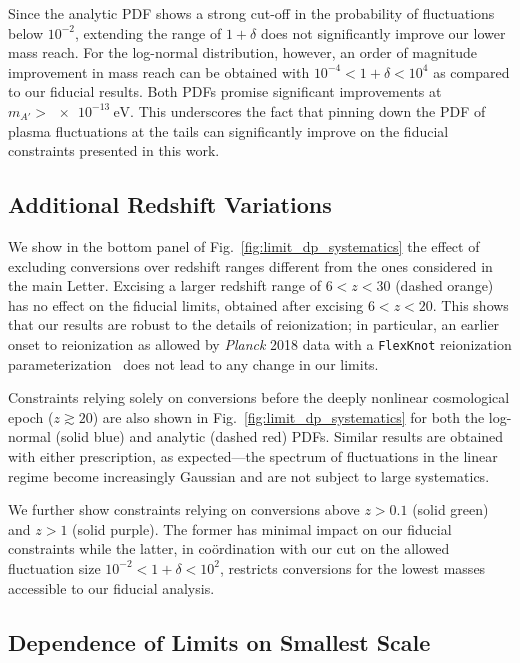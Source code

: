 \documentclass[prd,aps,10pt,nofootinbib,twocolumn,superscriptaddress,preprintnumbers,balancelastpage,longbibliography]{revtex4-1}
\begin{document}
Since the analytic PDF shows a strong cut-off in the probability of fluctuations below $10^{-2}$, extending the range of $1+\delta$ does not significantly improve our lower mass reach. For the log-normal distribution, however, an order of magnitude improvement in mass reach can be obtained with $10^{-4} < 1+\delta < 10^4$ as compared to our fiducial results. Both PDFs promise significant improvements at $m_{A'} > \SI{e-13}{\eV}$. This underscores the fact that pinning down the PDF of plasma fluctuations at the tails can significantly improve on the fiducial constraints presented in this work.

\subsection{Additional Redshift Variations}

We show in the bottom panel of Fig.~\ref{fig:limit_dp_systematics} the effect of excluding conversions over redshift ranges different from the ones considered in the main Letter. Excising a larger redshift range of $6 < z < 30$ (dashed orange) has no effect on the fiducial limits, obtained after excising $6 < z < 20$. This shows that our results are robust to the details of reionization; in particular, an earlier onset to reionization as allowed by \emph{Planck} 2018 data with a \texttt{FlexKnot} reionization parameterization~\cite{Aghanim:2018eyx} does not lead to any change in our limits.

Constraints relying solely on conversions before the deeply nonlinear cosmological epoch ($z \gtrsim 20$)  are also shown in Fig.~\ref{fig:limit_dp_systematics} for both the log-normal (solid blue) and analytic (dashed red) PDFs. Similar results are obtained with either prescription, as expected---the spectrum of fluctuations in the linear regime become increasingly Gaussian and are not subject to large systematics.

We further show constraints relying on conversions above $z > 0.1$ (solid green) and $z > 1$ (solid purple). The former has minimal impact on our fiducial constraints while the latter, in co\"ordination with our cut on the allowed fluctuation size $10^{-2} < 1 + \delta < 10^2$, restricts conversions for the lowest masses accessible to our fiducial analysis. \\

\subsection{Dependence of Limits on Smallest Scale}
\end{document}
